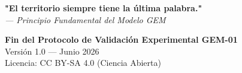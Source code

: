 \documentclass[12pt, a4paper]{article}
\begin{document}
\begin{center}
\vspace{1cm}
\textbf{\Large "El territorio siempre tiene la última palabra."} \\
\vspace{0.3cm}
\textit{— Principio Fundamental del Modelo GEM}
\end{center}

\vspace{1cm}
\begin{center}
\textbf{Fin del Protocolo de Validación Experimental GEM-01} \\
Versión 1.0 — Junio 2026 \\
Licencia: CC BY-SA 4.0 (Ciencia Abierta)
\end{center}
\end{document}
